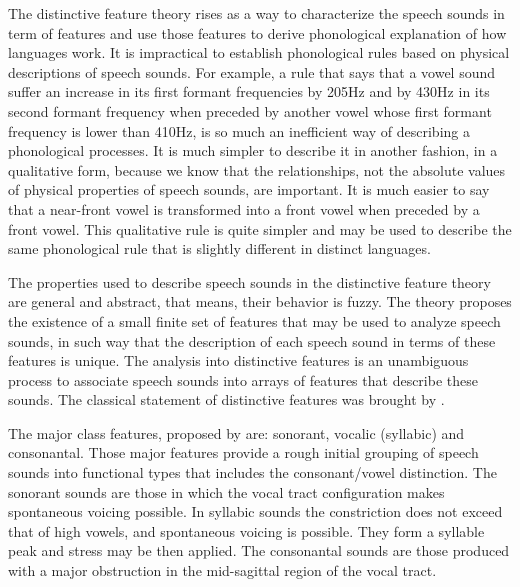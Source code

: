 The distinctive feature theory rises as a way to characterize the speech sounds in term of features and use those features to derive phonological explanation of how languages work. It is impractical to establish phonological rules based on physical descriptions of speech sounds. For example, a rule that says that a vowel sound suffer an increase in its first formant frequencies by 205Hz and by 430Hz in its second formant frequency when preceded by another vowel whose first formant frequency is lower than 410Hz, is so much an inefficient way of describing a phonological processes. It is much simpler to describe it in another fashion, in a qualitative form, because we know that the relationships, not the absolute values of physical properties of speech sounds, are important. It is much easier to say that a near-front vowel is transformed into a front vowel when preceded by a front vowel. This qualitative rule is quite simpler and may be used to describe the same phonological rule that is slightly different in distinct languages.

The properties used to describe speech sounds in the distinctive feature theory are general and abstract, that means, their behavior is fuzzy. The theory proposes the existence of a small finite set of features that may be used to analyze speech sounds, in such way that the description of each speech sound in terms of these features is unique. The analysis into distinctive features is an unambiguous process to associate speech sounds into arrays of features that describe these sounds. The classical statement of distinctive features was brought by \citet{chomsky1968a}.
 
The major class features, proposed by \citet{chomsky1968a} are: sonorant, vocalic (syllabic) and consonantal. Those major features provide a rough initial grouping of speech sounds into functional types that includes the consonant/vowel distinction. The sonorant sounds are those in which the vocal tract configuration makes spontaneous voicing possible. In syllabic sounds the constriction does not exceed that of high vowels, and spontaneous voicing is possible. They form a syllable peak and stress may be then applied. The consonantal sounds are those produced with a major obstruction in the mid-sagittal region of the vocal tract.

